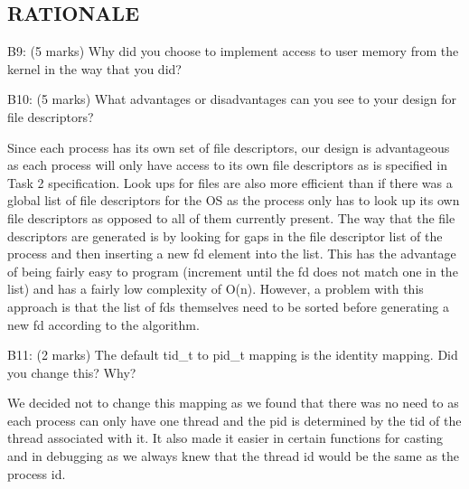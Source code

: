 \subsection*{RATIONALE}

\noindent B9: (5 marks)
Why did you choose to implement access to user memory from the
kernel in the way that you did?




\noindent B10: (5 marks)
What advantages or disadvantages can you see to your design
for file descriptors?


Since each process has its own set of file descriptors, our design is advantageous as each process will only have access to its own file descriptors as is specified in Task 2 specification. Look ups for files are also more efficient than if there was a global list of file descriptors for the OS as the process only has to look up its own file descriptors as opposed to all of them currently present. The way that the file descriptors are generated is by looking for gaps in the file descriptor list of the process and then inserting a new fd element into the list. This has the advantage of being fairly easy to program (increment until the fd does not match one in the list) and has a fairly low complexity of O(n). However, a problem with this approach is that the list of fds themselves need to be sorted before generating a new fd according to the algorithm.


\noindent B11: (2 marks)
The default tid\_t to pid\_t mapping is the identity mapping.
Did you change this? Why?


We decided not to change this mapping as we found that there was no need to as each process can only have one thread and the pid is determined by the tid of the thread associated with it. It also made it easier in certain functions for casting and in debugging as we always knew that the thread id would be the same as the process id.
